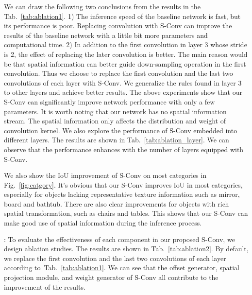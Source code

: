 \documentclass[journal]{IEEEtran}
\newcommand{\figref}[1]{Fig.~\ref{#1}}
\newcommand{\tabref}[1]{Tab.~\ref{#1}}
\newcommand{\mypara}[1]{\noindent {\textbf{#1}}}
\begin{document}
We can draw the following two conclusions from the results in the \tabref{tab:ablation1}.
1) The inference speed of the baseline network is fast, but its performance is poor.
Replacing convolution with S-Conv can improve the results of the baseline network
with a little bit more parameters and computational time.
2) In addition to the first convolution in layer 3 whose stride is 2,
the effect of replacing the later convolution is better.
The main reason would be that spatial information can better guide down-sampling operation in the first convolution.
Thus we choose to replace the first convolution and the last two convolutions
of each layer with S-Conv.
We generalize the rules found in layer 3 to other layers and achieve better results.
The above experiments show that our S-Conv can significantly improve network
performance with only a few parameters.
It is worth noting that our network has no spatial information stream.
The spatial information only affects the distribution and weight of
convolution kernel.
We also explore the performance of S-Conv embedded into different layers.
The results are shown in \tabref{tab:ablation_layer}.
We can observe that the performance enhances with the number of layers equipped with
S-Conv.

We also show the IoU improvement of S-Conv on most categories in
\figref{fig:catgory}. It's obvious that our S-Conv improves IoU in most categories,
especially for objects lacking representative texture information such as mirror, 
board and bathtub.
There are also clear improvements for objects with
rich spatial transformation, such as chairs and tables. 
This shows that our S-Conv can make good use of 
spatial information during the inference process.



\mypara{Architecture ablation}: To evaluate the effectiveness
of each component in our proposed S-Conv,
we design ablation studies.
The results are shown in \tabref{tab:ablation2}.
By default, we replace
the first convolution and the last two convolutions
of each layer according to~\tabref{tab:ablation1}.
We can see that the offset generator, spatial projection module, 
and weight generator
of S-Conv all contribute to the improvement of the results. 
\end{document}
